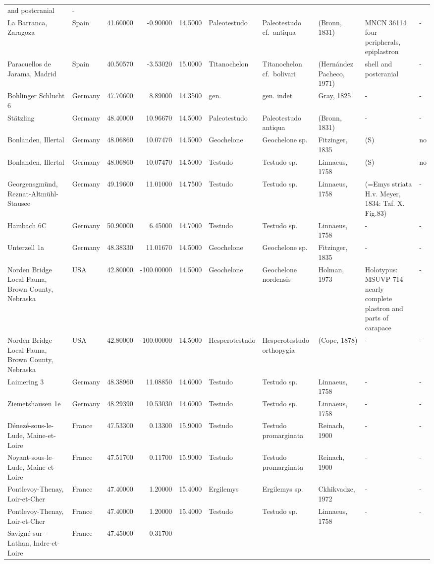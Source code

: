 \documentclass[]{article}
\begin{document}
\begin{longtable}[]{@{}llrrrlllll@{}}
and postcranial & -\tabularnewline
La Barranca, Zaragoza & Spain & 41.60000 & -0.90000 & 14.5000 &
Paleotestudo & Paleotestudo cf.~antiqua & (Bronn, 1831) & MNCN 36114
four peripherals, epiplastron & -\tabularnewline
Paracuellos de Jarama, Madrid & Spain & 40.50570 & -3.53020 & 15.0000 &
Titanochelon & Titanochelon cf.~bolivari & (Hernández Pacheco, 1971) &
shell and postcranial & -\tabularnewline
Bohlinger Schlucht 6 & Germany & 47.70600 & 8.89000 & 14.3500 & gen. &
gen. indet & Gray, 1825 & - & -\tabularnewline
Stätzling & Germany & 48.40000 & 10.96670 & 14.5000 & Paleotestudo &
Paleotestudo antiqua & (Bronn, 1831) & - & -\tabularnewline
Bonlanden, Illertal & Germany & 48.06860 & 10.07470 & 14.5000 &
Geochelone & Geochelone sp. & Fitzinger, 1835 & (S) & no\tabularnewline
Bonlanden, Illertal & Germany & 48.06860 & 10.07470 & 14.5000 & Testudo
& Testudo sp. & Linnaeus, 1758 & (S) & no\tabularnewline
Georgensgmünd, Reznat-Altmühl-Stausee & Germany & 49.19600 & 11.01000 &
14.7500 & Testudo & Testudo sp. & Linnaeus, 1758 & (=Emys striata H.v.
Meyer, 1834: Taf. X. Fig.83) & -\tabularnewline
Hambach 6C & Germany & 50.90000 & 6.45000 & 14.7000 & Testudo & Testudo
sp. & Linnaeus, 1758 & - & -\tabularnewline
Unterzell 1a & Germany & 48.38330 & 11.01670 & 14.5000 & Geochelone &
Geochelone sp. & Fitzinger, 1835 & - & -\tabularnewline
Norden Bridge Local Fauna, Brown County, Nebraska & USA & 42.80000 &
-100.00000 & 14.5000 & Geochelone & Geochelone nordensis & Holman, 1973
& Holotypus: MSUVP 714 nearly complete plastron and parts of carapace &
-\tabularnewline
Norden Bridge Local Fauna, Brown County, Nebraska & USA & 42.80000 &
-100.00000 & 14.5000 & Hesperotestudo & Hesperotestudo orthopygia &
(Cope, 1878) & - & -\tabularnewline
Laimering 3 & Germany & 48.38960 & 11.08850 & 14.6000 & Testudo &
Testudo sp. & Linnaeus, 1758 & - & -\tabularnewline
Ziemetshausen 1e & Germany & 48.29390 & 10.53030 & 14.6000 & Testudo &
Testudo sp. & Linnaeus, 1758 & - & -\tabularnewline
Dénezé-sous-le-Lude, Maine-et-Loire & France & 47.53300 & 0.13300 &
15.9000 & Testudo & Testudo promarginata & Reinach, 1900 & - &
-\tabularnewline
Noyant-sous-le-Lude, Maine-et-Loire & France & 47.51700 & 0.11700 &
15.9000 & Testudo & Testudo promarginata & Reinach, 1900 & - &
-\tabularnewline
Pontlevoy-Thenay, Loir-et-Cher & France & 47.40000 & 1.20000 & 15.4000 &
Ergilemys & Ergilemys sp. & Ckhikvadze, 1972 & - & -\tabularnewline
Pontlevoy-Thenay, Loir-et-Cher & France & 47.40000 & 1.20000 & 15.4000 &
Testudo & Testudo sp. & Linnaeus, 1758 & - & -\tabularnewline
Savigné-sur-Lathan, Indre-et-Loire & France & 47.45000 & 0.31700 &

\end{longtable}
\end{document}
